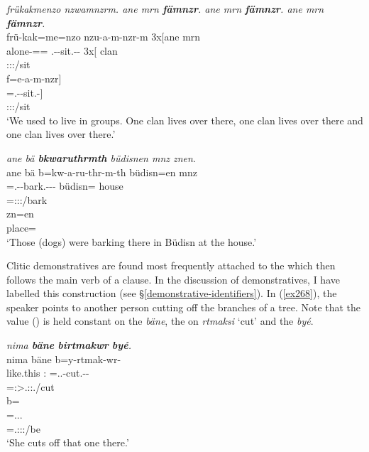 \begin{exe}
	\ex \emph{frükakmenzo nzwamnzrm. ane mrn \textbf{fämnzr}. ane mrn \textbf{fämnzr}. ane mrn \textbf{fämnzr}.}\\
	\glll frü-kak=me=nzo nzu-a-m-nzr-m 3x[ane mrn\\
	alone-\Distr=\Ins=\Only{} \Fnsg.\Betatwo-\Vc-sit.\Ext-\Ndu-\Dur{} 3x[\Dem{} clan\\
	{} \footnotesize{\Fpl:\Sbj:\Pst:\Dur/sit} {} {}\\
	\sn
	\glll f=e-a-m-nzr]\\
	\Dist=\Stnsg.\Alph-\Vc-sit.\Ext-\Ndu]\\
	\footnotesize{\Stpl:\Sbj:\Nonpast:\Ipfv/sit}\\
	\trans `We used to live in groups. One clan lives over there, one clan lives over there and one clan lives over there.'
	\label{ex266}
\end{exe}
\begin{exe}
	\ex \emph{ane bä \textbf{bkwaruthrmth} büdisnen mnz znen}.\\
	\glll ane bä b=kw-a-ru-thr-m-th büdisn=en mnz\\
	\Dem{} \Med{} \Med=\M.\Betaone-\Vc-bark.\Ext-\Ndu-\Dur-\Stnsg{} büdisn=\Loc{} house\\
	{} {} \footnotesize{\Med=\Stpl:\Sbj:\Pst:\Dur/bark} {} {} {}\\
	\sn
	\gll zn=en\\
	place=\Loc{}\\
	\trans `Those (dogs) were barking there in Büdisn at the house.'
	\label{ex267}
\end{exe}

Clitic demonstratives are found most frequently attached to the  which then follows the main verb of a clause. In the discussion of demonstratives, I have labelled this construction   (see \S{}\ref{demonstrative-identifiers}). In (\ref{ex268}), the speaker points to another person cutting off the branches of a tree. Note that the  value (\Med) is held constant on the   \emph{bäne}, the   on \emph{rtmaksi} `cut' and the   \emph{byé}.

\begin{exe}
	\ex \emph{nima \textbf{bäne} \textbf{birtmakwr} \textbf{byé}.}\\
	\glll nima bäne b=y-rtmak-wr-\Zero{}\\
	like.this \Dem:\Med{} \Med=\Tsg.\Masc.\Alph-cut.\Ext-\Ndu-\Stsg{}\\
	{} {} \footnotesize{\Med=\Stsg:\Sbj>\Tsg.\Masc:\Obj:\Nonpast.\Ipfv/cut}\\
	\sn
	\glll b=\\
	\Med=\Tsg.\Masc.\Cop.\Ndu{}\\
	\footnotesize{\Med=\Tsg.\Masc:\Sbj:\Nonpast:\Ipfv/be}\\
	\trans `She cuts off that one there.'
	\label{ex268}
\end{exe}

